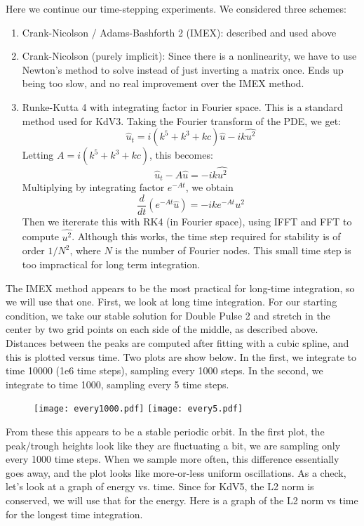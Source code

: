 \documentclass[12pt]{article}
\begin{document}
Here we continue our time-stepping experiments. We considered three schemes:
\begin{enumerate}
	\item Crank-Nicolson / Adams-Bashforth 2 (IMEX): described and used above
	\item Crank-Nicolson (purely implicit): Since there is a nonlinearity, we have to use Newton's method to solve instead of just inverting a matrix once. Ends up being too slow, and no real improvement over the IMEX method. 
	\item Runke-Kutta 4 with integrating factor in Fourier space. This is a standard method used for KdV3. Taking the Fourier transform of the PDE, we get:
	\[
	\hat{u}_t = i(k^5 + k^3 + kc)\hat{u} - ik\widehat{u^2}
	\] 
	Letting $A = i(k^5 + k^3 + kc)$, this becomes:
	\[
	\hat{u}_t - A\hat{u} = - ik\widehat{u^2}
	\]
	Multiplying by integrating factor $e^{-At}$, we obtain
	\[
	\frac{d}{dt}\left(e^{-At}\hat{u} \right) = -ik e^{-At} \widehat{u^2}
	\] 
	Then we itererate this with RK4 (in Fourier space), using IFFT and FFT to compute $\widehat{u^2}$. Although this works, the time step required for stability is of order $1/N^2$, where $N$ is the number of Fourier nodes. This small time step is too impractical for long term integration.
\end{enumerate}

The IMEX method appears to be the most practical for long-time integration, so we will use that one. First, we look 
at long time integration. For our starting condition, we take our stable solution for Double Pulse 2 and stretch in the center by two grid points on each side of the middle, as described above. Distances between the peaks are computed after fitting with a cubic spline, and this is plotted versus time. Two plots are show below. In the first, we integrate to time 10000 (1e6 time steps), sampling every 1000 steps. In the second, we integrate to time 1000, sampling every 5 time steps.

\begin{figure}[H]
	\texttt{[image: every1000.pdf]}
	\texttt{[image: every5.pdf]}
\end{figure}

From these this appears to be a stable periodic orbit. In the first plot, the peak/trough heights look like they are fluctuating a bit, we are sampling only every 1000 time steps. When we sample more often, this difference essentially goes away, and the plot looks like more-or-less uniform oscillations. As a check, let's look at a graph of energy vs. time. Since for KdV5, the L2 norm is conserved, we will use that for the energy. Here is a graph of the L2 norm vs time for the longest time integration.
\end{document}
